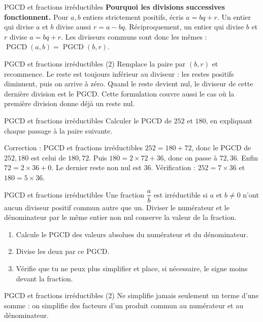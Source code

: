 \documentclass[aspectratio=169,10pt]{beamer}
\begin{document}
\begin{frame}{PGCD et fractions irréductibles}
\textbf{Pourquoi les divisions successives fonctionnent.} Pour \(a,b\) entiers strictement positifs, écris \(a=bq+r\). Un entier qui divise \(a\) et \(b\) divise aussi \(r=a-bq\). Réciproquement, un entier qui divise \(b\) et \(r\) divise \(a=bq+r\). Les diviseurs communs sont donc les mêmes : \(\operatorname{PGCD}(a,b)=\operatorname{PGCD}(b,r)\).
\end{frame}
\begin{frame}{PGCD et fractions irréductibles (2)}
Remplace la paire par \((b,r)\) et recommence. Le reste est toujours inférieur au diviseur : les restes positifs diminuent, puis on arrive à zéro. Quand le reste devient nul, le diviseur de cette dernière division est le PGCD. Cette formulation couvre aussi le cas où la première division donne déjà un reste nul.
\end{frame}
\begin{frame}{PGCD et fractions irréductibles}
Calculer le PGCD de \(252\) et \(180\), en expliquant chaque passage à la paire suivante.
\end{frame}
\begin{frame}{Correction : PGCD et fractions irréductibles}
\(252=180+72\), donc le PGCD de \(252,180\) est celui de \(180,72\). Puis \(180=2\times72+36\), donc on passe à \(72,36\). Enfin \(72=2\times36+0\). Le dernier reste non nul est \(36\). Vérification : \(252=7\times36\) et \(180=5\times36\).
\end{frame}
\begin{frame}{PGCD et fractions irréductibles}
Une fraction \(\dfrac ab\) est irréductible si \(a\) et \(b\ne0\) n'ont aucun diviseur positif commun autre que un. Diviser le numérateur et le dénominateur par le même entier non nul conserve la valeur de la fraction.

\begin{enumerate}
\setcounter{enumi}{0}\item Calcule le PGCD des valeurs absolues du numérateur et du dénominateur.
\item Divise les deux par ce PGCD.
\item Vérifie que tu ne peux plus simplifier et place, si nécessaire, le signe moins devant la fraction.

\end{enumerate}
\end{frame}
\begin{frame}{PGCD et fractions irréductibles (2)}
Ne simplifie jamais seulement un terme d'une somme : on simplifie des facteurs d'un produit commun au numérateur et au dénominateur.
\end{frame}
\end{document}
